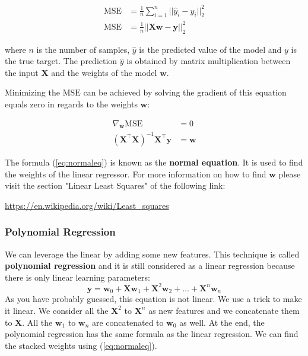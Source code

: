 \documentclass[12pt]{report}
\begin{document}
                \begin{align}
                \text{MSE} &= \frac{1}{n}\sum_{i=1}^{n}{||\hat{y}_i - y_i ||_{2}^{2}} \\
                \text{MSE} &= \frac{1}{n}||\boldsymbol{X}\boldsymbol{w} - \boldsymbol{y} ||_2^2
                \end{align}
                
                where $n$ is the number of samples, $\hat{y}$ is the predicted value of the model and $y$ is the true target.
                The prediction $\hat{y}$ is obtained by matrix multiplication between the input $\boldsymbol{X}$ and the weights of the model $\boldsymbol{w}$.
                
                Minimizing the $\text{MSE}$ can be achieved by solving the gradient of this equation equals zero in regards to the weights $\boldsymbol{w}$:
                
                \begin{align}
                \nabla_{\boldsymbol{w}}\text{MSE} &= 0 \\
                (\boldsymbol{X}^\top \boldsymbol{X})^{-1}\boldsymbol{X}^\top \boldsymbol{y} &= \boldsymbol{w} \label{eq:normaleq}
                \end{align}
                
                The formula (\ref{eq:normaleq}) is known as the \textbf{normal equation}. It is used to find the weights of the linear regressor.
                For more information on how to find $\boldsymbol{w}$ please visit the section "Linear Least Squares" of the following link:
                
                \url{https://en.wikipedia.org/wiki/Least_squares}
                
                \subsubsection{Polynomial Regression}
                    We can leverage the linear by adding some new features.
                    This technique is called \textbf{polynomial regression} and it is still considered as a linear regression because there is only linear learning parameters:
                    \begin{equation}
                        \boldsymbol{y} = \boldsymbol{w}_0 + \boldsymbol{X}\boldsymbol{w}_1 + \boldsymbol{X}^2\boldsymbol{w}_2 + \dots + \boldsymbol{X}^n\boldsymbol{w}_n
                    \end{equation}
                    As you have probably guessed, this equation is not linear. We use a trick to make it linear. We consider all the $\boldsymbol{X}^2$ to $\boldsymbol{X}^n$ as new features and we concatenate them to $\boldsymbol{X}$.
                    All the $\boldsymbol{w}_1$ to $\boldsymbol{w}_n$ are concatenated to $\boldsymbol{w}_0$ as well.
                    At the end, the polynomial regression has the same formula as the linear regression. We can find the stacked weights using (\ref{eq:normaleq}).
                    
\end{document}
